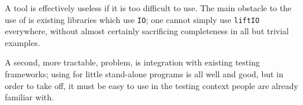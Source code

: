 A tool is effectively useless if it is too difficult to use. The main
obstacle to the use of \dejafu{} is existing libraries which use
\verb|IO|; one cannot simply use \verb|liftIO| everywhere, without
almost certainly sacrificing completeness in all but trivial examples.

A second, more tractable, problem, is integration with existing
testing frameworks; using \dejafu{} for little stand-alone programs is
all well and good, but in order to take off, it must be easy to use in
the testing context people are already familiar with.
